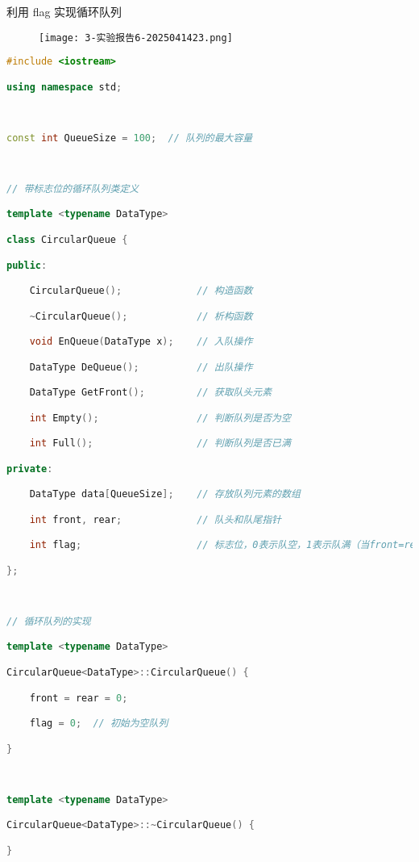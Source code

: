 利用 flag 实现循环队列

\begin{figure}[H]
\centering
\texttt{[image: 3-实验报告6-2025041423.png]}
\label{}
\end{figure}

\begin{lstlisting}[language=C++]
#include <iostream>

using namespace std;

  

const int QueueSize = 100;  // 队列的最大容量

  

// 带标志位的循环队列类定义

template <typename DataType>

class CircularQueue {

public:

    CircularQueue();             // 构造函数

    ~CircularQueue();            // 析构函数

    void EnQueue(DataType x);    // 入队操作

    DataType DeQueue();          // 出队操作

    DataType GetFront();         // 获取队头元素

    int Empty();                 // 判断队列是否为空

    int Full();                  // 判断队列是否已满

private:

    DataType data[QueueSize];    // 存放队列元素的数组

    int front, rear;             // 队头和队尾指针

    int flag;                    // 标志位，0表示队空，1表示队满（当front=rear时）

};

  

// 循环队列的实现

template <typename DataType>

CircularQueue<DataType>::CircularQueue() {

    front = rear = 0;

    flag = 0;  // 初始为空队列

}

  

template <typename DataType>

CircularQueue<DataType>::~CircularQueue() {

}


\end{lstlisting}
